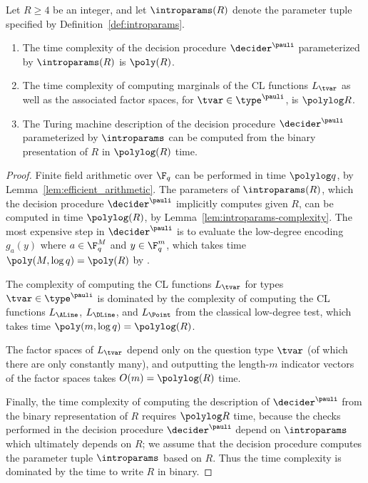 \begin{lemma}
  \label{lem:qld-complexity}
  Let $R \geq 4$ be an integer, and let $\introparams(R)$ denote the parameter tuple
  specified by Definition~\ref{def:introparams}.
  \begin{enumerate}
	\item The time complexity of the decision procedure $\decider^\pauli$
    parameterized by $\introparams(R)$ is $\poly(R)$.
	\item The time complexity of computing marginals of the CL functions $L_\tvar$
    as well as the associated factor spaces, for $\tvar \in \type^\pauli$, is
    $\polylog R$.
	\item The Turing machine description of the decision procedure
    $\decider^\pauli$ parameterized by $\introparams$ can be computed from the
    binary presentation of $R$ in $\polylog (R)$ time.
  \end{enumerate}
\end{lemma}

\begin{proof}
	Finite field arithmetic over $\F_q$ can be performed in time $\polylog q$, by
  Lemma~\ref{lem:efficient_arithmetic}.
  The parameters of $\introparams(R)$, which the decision procedure
  $\decider^\pauli$ implicitly computes given $R$, can be computed in time
  $\polylog(R)$, by Lemma~\ref{lem:introparams-complexity}.
  The most expensive step in $\decider^\pauli$ is to evaluate the low-degree
  encoding $g_{a}(y)$ where $a \in \F_q^M$ and $y \in \F_q^m$, which
  takes time $\poly(M,\log q) = \poly(R)$ by .
	
  The complexity of computing the CL functions $L_\tvar$ for types $\tvar \in
  \type^\pauli$ is dominated by the complexity of computing the CL functions
  $L_\ALine$, $L_\DLine$, and $L_\Point$ from the classical low-degree test, which takes time
  $\poly(m, \log q) = \polylog(R)$.

  The factor spaces of $L_\tvar$ depend only on the question type $\tvar$ (of
  which there are only constantly many), and outputting the length-$m$ indicator
  vectors of the factor spaces takes $O(m) = \polylog (R)$ time.

  Finally, the time complexity of computing the description of $\decider^\pauli$
  from the binary representation of $R$ requires $\polylog R$ time, because the
  checks performed in the decision procedure $\decider^\pauli$ depend on
  $\introparams$ which ultimately depends on $R$; we assume that the decision
  procedure computes the parameter tuple $\introparams$ based on $R$.
  Thus the time complexity is dominated by the time to write $R$ in binary.
\end{proof}
 
